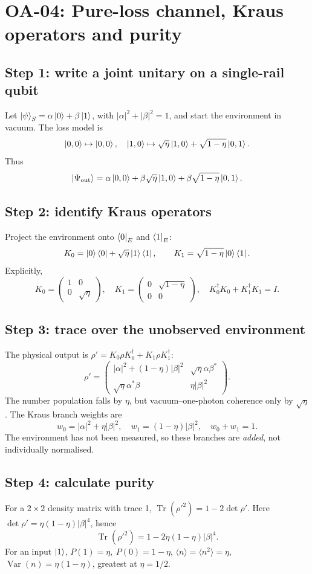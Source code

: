 
\section{OA-04: Pure-loss channel, Kraus operators and purity}
\subsection*{Step 1: write a joint unitary on a single-rail qubit}
Let \(\left\lvert \psi\right\rangle_S=\alpha\left\lvert 0\right\rangle+\beta\left\lvert 1\right\rangle\), with
\(|\alpha|^2+|\beta|^2=1\), and start the environment
in vacuum. The loss model is
\[
\left\lvert 0,0\right\rangle\mapsto\left\lvert 0,0\right\rangle,\quad
\left\lvert 1,0\right\rangle\mapsto\sqrt\eta\left\lvert 1,0\right\rangle
+\sqrt{1-\eta}\left\lvert 0,1\right\rangle.
\]
Thus
\[
\left\lvert \Psi_{\rm out}\right\rangle=
\alpha\left\lvert 0,0\right\rangle
+\beta\sqrt\eta\left\lvert 1,0\right\rangle
+\beta\sqrt{1-\eta}\left\lvert 0,1\right\rangle.
\]

\subsection*{Step 2: identify Kraus operators}
Project the environment onto \(\left\langle 0\right\rvert_E\) and \(\left\langle 1\right\rvert_E\):
\[
K_0=\left\lvert 0\right\rangle\left\langle 0\right\rvert+\sqrt\eta\left\lvert 1\right\rangle\left\langle 1\right\rvert,\qquad
K_1=\sqrt{1-\eta}\left\lvert 0\right\rangle\left\langle 1\right\rvert.
\]
Explicitly,
\[
K_0=\begin{pmatrix}1&0\\0&\sqrt\eta\end{pmatrix},\quad
K_1=\begin{pmatrix}0&\sqrt{1-\eta}\\0&0\end{pmatrix},\quad
K_0^\dagger K_0+K_1^\dagger K_1=I .
\]

\subsection*{Step 3: trace over the unobserved environment}
The physical output is \(\rho'=K_0\rho K_0^\dagger+
K_1\rho K_1^\dagger\):
\[
\boxed{\rho'=
\begin{pmatrix}
|\alpha|^2+(1-\eta)|\beta|^2&\sqrt\eta\alpha\beta^*\\
\sqrt\eta\alpha^*\beta&\eta|\beta|^2
\end{pmatrix}}.
\]
The number population falls by \(\eta\), but vacuum--one-photon
coherence only by \(\sqrt\eta\).
The Kraus branch weights are
\[
w_0=|\alpha|^2+\eta|\beta|^2,\quad
w_1=(1-\eta)|\beta|^2,\quad w_0+w_1=1.
\]
The environment has not been measured, so these branches are
\emph{added}, not individually normalised.

\subsection*{Step 4: calculate purity}
For a \(2\times2\) density matrix with trace 1,
\(\operatorname{Tr}(\rho'^2)=1-2\det\rho'\).
Here \(\det\rho'=\eta(1-\eta)|\beta|^4\), hence
\[
\boxed{\operatorname{Tr}(\rho'^2)
=1-2\eta(1-\eta)|\beta|^4}.
\]
For an input \(\left\lvert 1\right\rangle\), \(P(1)=\eta,\ P(0)=1-\eta\),
\(\langle n\rangle=\langle n^2\rangle=\eta\),
\(\operatorname{Var}(n)=\eta(1-\eta)\), greatest at \(\eta=1/2\).
